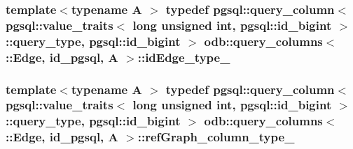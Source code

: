 \subsubsection[{id\+Edge\+\_\+type\+\_\+}]{\setlength{\rightskip}{0pt plus 5cm}template$<$typename A $>$ typedef pgsql\+::query\+\_\+column$<$ pgsql\+::value\+\_\+traits$<$ long unsigned int, pgsql\+::id\+\_\+bigint $>$\+::query\+\_\+type, pgsql\+::id\+\_\+bigint $>$ odb\+::query\+\_\+columns$<$ \+::{\bf Edge}, id\+\_\+pgsql, A $>$\+::{\bf id\+Edge\+\_\+type\+\_\+}}\label{structodb_1_1query__columns_3_01_1_1_edge_00_01id__pgsql_00_01_a_01_4_ac2099ffe11e8c8289cfaa30be075ece5}
\hypertarget{structodb_1_1query__columns_3_01_1_1_edge_00_01id__pgsql_00_01_a_01_4_ab076999f6fdd1d991b3ccec1899e2618}{}
\subsubsection[{ref\+Graph\+\_\+column\+\_\+type\+\_\+}]{\setlength{\rightskip}{0pt plus 5cm}template$<$typename A $>$ typedef pgsql\+::query\+\_\+column$<$ pgsql\+::value\+\_\+traits$<$ long unsigned int, pgsql\+::id\+\_\+bigint $>$\+::query\+\_\+type, pgsql\+::id\+\_\+bigint $>$ odb\+::query\+\_\+columns$<$ \+::{\bf Edge}, id\+\_\+pgsql, A $>$\+::{\bf ref\+Graph\+\_\+column\+\_\+type\+\_\+}}\label{structodb_1_1query__columns_3_01_1_1_edge_00_01id__pgsql_00_01_a_01_4_ab076999f6fdd1d991b3ccec1899e2618}
\hypertarget{structodb_1_1query__columns_3_01_1_1_edge_00_01id__pgsql_00_01_a_01_4_aa7a5334fc9c390c29710c3937ac9c8ac}{}
